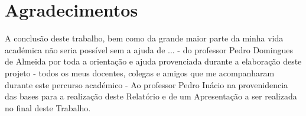 \chapter*{Agradecimentos}
\label{chap:ack}

A conclusão deste trabalho, bem como da grande maior parte da minha vida académica não seria possível sem a ajuda de ...
\newline - do professor Pedro Domingues de Almeida por toda a orientação e ajuda provenciada durante a elaboração deste projeto
\newline - todos os meus docentes, colegas e amigos que me acompanharam durante este percurso académico
\newline - Ao professor Pedro Inácio na provenidencia das bases para a realização deste Relatório e de um Apresentação a ser realizada no final deste Trabalho.
